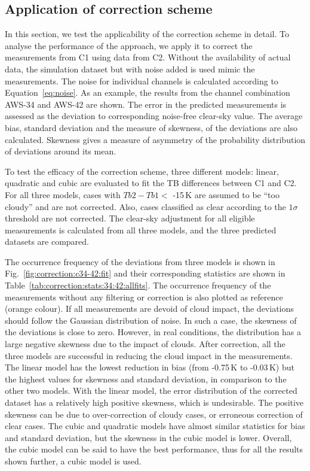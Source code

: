 \documentclass[12pt]{article}
\begin{document}
\subsection{Application of correction scheme}
%
In this section, we test the applicability of the correction scheme in detail.
To analyse the performance of the approach, we apply it to correct the
measurements from C1 using data from C2. Without the availability of actual
data, the simulation dataset but with noise added is used mimic the measurements. The
noise for individual channels is calculated according to
Equation~\ref{eq:noise}. As an example, the results from the channel
combination AWS-34 and AWS-42 are shown. The error in the
predicted measurements is assessed as the deviation to corresponding noise-free
clear-sky value. The average bias, standard deviation and the measure of skewness, of the deviations are also calculated. Skewness gives a measure of asymmetry of the probability distribution of deviations around its mean.

To test the efficacy of the correction scheme, three different models: linear,
quadratic and cubic are evaluated to fit the TB differences between C1 and C2.
For all three models, cases with $Tb2-Tb1 < $ -15\,K are assumed to be ``too
cloudy'' and are not corrected. Also, cases classified as clear according to
the $1\sigma$ threshold are not corrected. The clear-sky adjustment for all
eligible measurements is calculated from all three models, and the three
predicted datasets are compared.

The occurrence frequency of the deviations from three models is shown in
Fig.~\ref{fig:correction:c34-42:fit} and their corresponding statistics are shown in Table~\ref{tab:correction:stats:34:42:allfits}. The occurrence frequency of the
measurements without any filtering or correction is also plotted as reference
(orange colour). If all measurements are devoid of cloud impact, the
deviations should follow the Gaussian distribution of noise. In such a case, the skewness of the deviations is close to zero.  However, in real conditions, the distribution has a large negative skewness due to the impact of clouds. After correction, all the three models are successful in reducing the cloud impact in the
measurements. The linear model has the lowest reduction in bias (from  -0.75\,K to -0.03\,K) but the highest values for skewness and standard deviation, in comparison to the other two models.  With the linear model, the error distribution of the corrected dataset has a relatively high positive skewness, which is undesirable. The positive skewness can be due to over-correction of cloudy cases, or erroneous correction of clear cases. The cubic  and quadratic models have almost similar statistics for bias and standard deviation, but the skewness in the cubic model is lower. Overall, the cubic model can be said to have the best performance, thus for all the results shown further, a cubic model is used.
\end{document}
